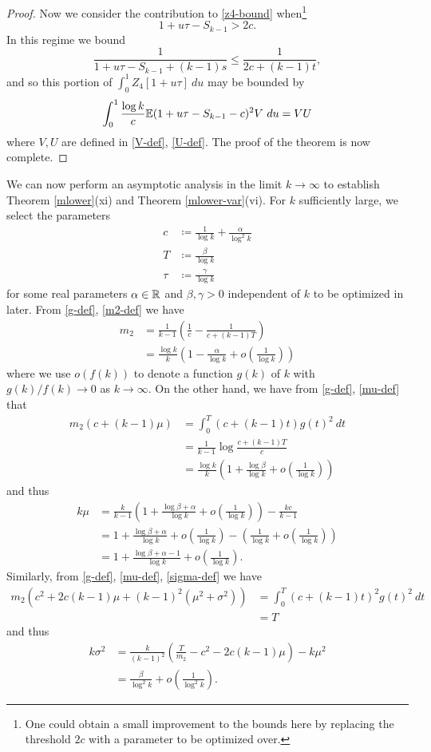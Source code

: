 \begin{proof}
Now we consider the contribution to \eqref{z4-bound} when\footnote{One could obtain a small improvement to the bounds here by replacing the threshold $2c$ with a parameter to be optimized over.}
$$ 1+u\tau-S_{k-1} > 2c.$$
In this regime we bound
$$ \frac{1}{1+u\tau-S_{k-1}+(k-1)s} \leq \frac{1}{2c+(k-1)t},$$ 
and so this portion of $\int_0^1 Z_4[1+u\tau]\ du$ may be bounded by 
$$\int_0^1 \frac{\log k}{c} \mathbb{E} (1 + u\tau - S_{k-1} - c)^2 V\ du = VU$$
where $V, U$ are defined in \eqref{V-def}, \eqref{U-def}.  The proof of the theorem is now complete.
\end{proof}

We can now perform an asymptotic analysis in the limit $k \to \infty$ to establish Theorem \ref{mlower}(xi) and Theorem \ref{mlower-var}(vi).  For $k$ sufficiently large, we select the parameters
\begin{align*}
c &\coloneqq \frac{1}{\log k} + \frac{\alpha}{\log^2 k} \\
T &\coloneqq \frac{\beta}{\log k} \\
\tau &\coloneqq \frac{\gamma}{\log k}
\end{align*}
for some real parameters $\alpha \in \mathbb{R}$ and $\beta,\gamma > 0$ independent of $k$ to be optimized in later.  From \eqref{g-def}, \eqref{m2-def} we have
\begin{align*}
m_2 &= \frac{1}{k-1} \left( \frac{1}{c} - \frac{1}{c+(k-1)T} \right) \\
&= \frac{\log k}{k} \left(1 - \frac{\alpha}{\log k} + o( \frac{1}{\log k} ) \right)
\end{align*}
where we use $o(f(k))$ to denote a function $g(k)$ of $k$ with $g(k)/f(k) \to 0$ as $k \to \infty$.  On the other hand, we have from \eqref{g-def}, \eqref{mu-def} that
\begin{align*}
m_2 (c + (k-1) \mu) &= \int_0^T (c+(k-1)t) g(t)^2\ dt \\
&= \frac{1}{k-1} \log \frac{c+(k-1)T}{c} \\
&= \frac{\log k}{k} \left(1 + \frac{\log \beta}{\log k} + o( \frac{1}{\log k} ) \right)
\end{align*}
and thus
\begin{align*}
 k\mu &= \frac{k}{k-1} \left(1 + \frac{\log \beta + \alpha}{\log k} + o(\frac{1}{\log k} ) \right) - \frac{kc}{k-1} \\
&= 1 + \frac{\log \beta + \alpha}{\log k} + o\left( \frac{1}{\log k} \right) - \left( \frac{1}{\log k} + o\left( \frac{1}{\log k} \right) \right)\\
&= 1 + \frac{\log \beta + \alpha - 1}{\log k} + o\left( \frac{1}{\log k} \right).
\end{align*}
Similarly, from \eqref{g-def}, \eqref{mu-def}, \eqref{sigma-def} we have
\begin{align*}
m_2 (c^2 + 2c(k-1)\mu + (k-1)^2 (\mu^2+\sigma^2)) &= \int_0^T (c+(k-1)t)^2 g(t)^2\ dt \\
&= T
\end{align*}
and thus
\begin{align*}
k \sigma^2 &= \frac{k}{(k-1)^2} \left(\frac{T}{m_2} - c^2 - 2c(k-1)\mu\right) - k \mu^2 \\
&= \frac{\beta}{\log^2 k} + o( \frac{1}{\log^2 k} ).
\end{align*}

